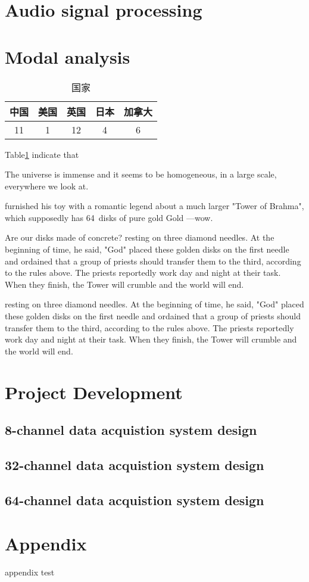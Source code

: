 \documentclass[UTF8]{book}
\begin{document}
	\part{Audio signal processing}
	
	\part{Modal analysis}
	
	
	
	\begin{table}[H]
		\centering
		\caption{国家}
		\begin{tabular}{|c|c|c|c|c|}
			\hline
			中国 &美国 &英国 &日本&加拿大\\
			\hline
			11&1&12&4&6\\
			\hline
		\end{tabular}
		\label{tab2}    
	\end{table}
	
	Table\ref{tab2} indicate that
	
	The universe is immense and it seems to be homogeneous, 
	in a large scale, everywhere we look at.
	
	furnished his toy with a romantic legend about a much larger
	"Tower of Brahma", which supposedly has 64~disks of pure gold
	Gold ---wow.\par Are our disks made of concrete? 
	resting on three diamond needles. At the beginning of time, he said,
	"God" placed these golden disks on the first needle and ordained that a
	group of priests should transfer them to the third, according to the
	rules above. The priests reportedly work day and night at their task.
	When they finish, the Tower will crumble and the world will end.
	
	resting on three diamond needles. At the beginning of time, he said,
	"God" placed these golden disks on the first needle and ordained that a
	group of priests should transfer them to the third, according to the
	rules above. The priests reportedly work day and night at their task.
	When they finish, the Tower will crumble and the world will end.
	
	
	\part{Project Development}
	\chapter{8-channel data acquistion system design}
	\chapter{32-channel data acquistion system design}
	\chapter{64-channel data acquistion system design}
	
	\part{Appendix}
	
	appendix test
	
	
\end{document}
